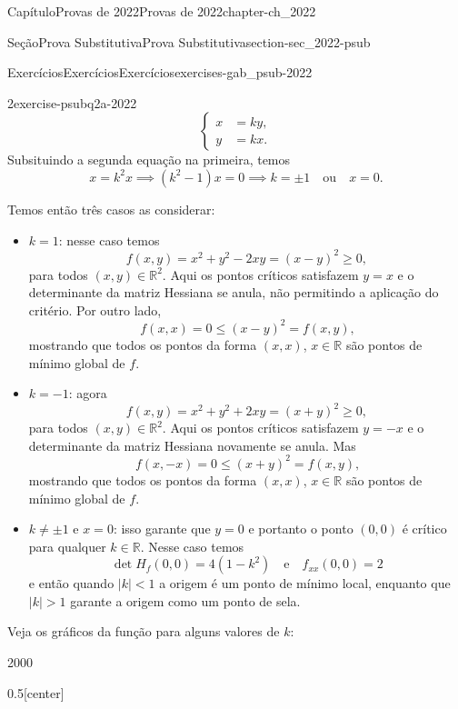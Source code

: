 \documentclass[oneside,10pt,]{book}
\numberwithin{equation}{section}
\newcommand{\R}{\mathbb R}
\begin{document}
\begin{chapterptx}{Capítulo}{Provas de 2022}{}{Provas de 2022}{}{}{chapter-ch_2022}
\begin{sectionptx}{Seção}{Prova Substitutiva}{}{Prova Substitutiva}{}{}{section-sec_2022-psub}
\begin{exercises-subsection-numberless}{Exercícios}{Exercícios}{}{Exercícios}{}{}{exercises-gab_psub-2022}
\begin{divisionexercise}{2}{}{}{exercise-psubq2a-2022}
\begin{equation*}
\begin{cases}
x&=ky,\\ y&=kx.  \end{cases}
\end{equation*}
Subsituindo a segunda equação na primeira, temos%
\begin{equation*}
x=k^2 x \implies (k^2 - 1)x=0 \implies k = \pm 1\quad
\text{ou}\quad x = 0.
\end{equation*}
%
\par
Temos então três casos as considerar:%
\begin{itemize}[label=\textbullet]
\item{}\(k=1\): nesse caso temos%
\begin{equation*}
f(x,y)=x^2+y^2-2xy=(x-y)^2\geq 0,
\end{equation*}
para todos \((x,y)\in\R^2\). Aqui os pontos críticos satisfazem \(y=x\) e o determinante da matriz Hessiana se anula, não permitindo a aplicação do critério. Por outro lado,%
\begin{equation*}
f(x,x)=0\leq(x-y)^2=f(x,y)\text{,}
\end{equation*}
mostrando que todos os pontos da forma \((x,x)\), \(x\in\R\) são pontos de mínimo global de \(f\).%
\item{}\(k=-1\): agora%
\begin{equation*}
f(x,y)=x^2+y^2+2xy=(x+y)^2\geq
0,
\end{equation*}
para todos \((x,y)\in\R^2\). Aqui os pontos críticos satisfazem \(y=-x\) e o determinante da matriz Hessiana novamente se anula. Mas%
\begin{equation*}
f(x,-x)=0\leq(x+y)^2=f(x,y)\text{,}
\end{equation*}
mostrando que todos os pontos da forma \((x,x)\), \(x\in\R\) são pontos de mínimo global de \(f\).%
\item{}\(k\neq\pm 1\) e \(x=0\): isso garante que \(y=0\) e portanto o ponto \((0,0)\) é crítico para qualquer \(k\in\R\). Nesse caso temos%
\begin{equation*}
\det
H_f(0,0)=4(1-k^2)\quad\text{e}\quad f_{xx}(0,0)=2
\end{equation*}
e então quando \(|k|< 1\) a origem é um ponto de mínimo local, enquanto que \(|k|> 1\) garante a origem como um ponto de sela.%
\end{itemize}
%
\par
Veja os gráficos da função para alguns valores de \(k\):%
\begin{sidebyside}{2}{0}{0}{0}%
\begin{sbspanel}{0.5}[center]%

\end{sbspanel}
\end{sidebyside}
\end{divisionexercise}
\end{exercises-subsection-numberless}
\end{sectionptx}
\end{chapterptx}
\end{document}
